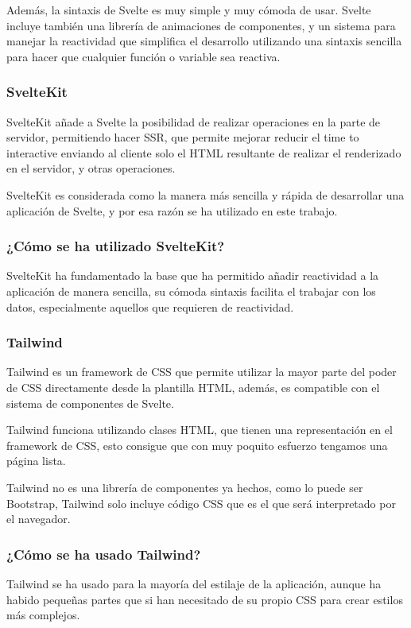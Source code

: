 Además, la sintaxis de Svelte es muy simple y muy cómoda de usar. Svelte incluye también una librería de animaciones de componentes, y un sistema para manejar la reactividad que simplifica el desarrollo utilizando una sintaxis sencilla para hacer que cualquier función o variable sea reactiva.

\subsubsection{SvelteKit}
SvelteKit añade a Svelte la posibilidad de realizar operaciones en la parte de servidor, permitiendo hacer SSR, que permite mejorar reducir el time to interactive enviando al cliente solo el HTML resultante de realizar el renderizado en el servidor, y otras operaciones.

SvelteKit es considerada como la manera más sencilla y rápida de desarrollar una aplicación de Svelte, y por esa razón se ha utilizado en este trabajo.

\subsubsection{¿Cómo se ha utilizado SvelteKit?}
SvelteKit ha fundamentado la base que ha permitido añadir reactividad a la aplicación de manera sencilla, su cómoda sintaxis facilita el trabajar con los datos, especialmente aquellos que requieren de reactividad.

\subsubsection{Tailwind}
Tailwind \cite{tailwind_docs} es un framework de CSS que permite utilizar la mayor parte del poder de CSS directamente desde la plantilla HTML, además, es compatible con el sistema de componentes de Svelte.

Tailwind funciona utilizando clases HTML, que tienen una representación en el framework de CSS, esto consigue que con muy poquito esfuerzo tengamos una página lista.

Tailwind no es una librería de componentes ya hechos, como lo puede ser Bootstrap, Tailwind solo incluye código CSS que es el que será interpretado por el navegador.

\subsubsection{¿Cómo se ha usado Tailwind?}
Tailwind se ha usado para la mayoría del estilaje de la aplicación, aunque ha habido pequeñas partes que si han necesitado de su propio CSS para crear estilos más complejos.

